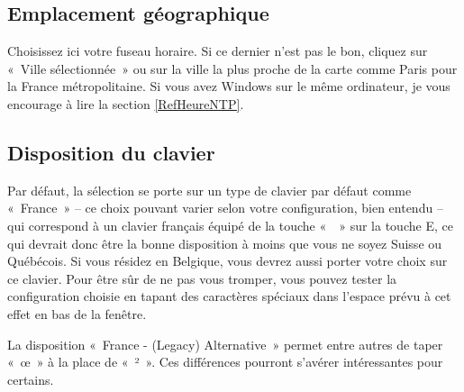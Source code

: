 \subsection{Emplacement géographique}
Choisissez ici votre fuseau horaire. Si ce dernier n'est pas le bon, cliquez sur «~Ville sélectionnée~» ou sur la ville la plus proche de la carte comme Paris pour la France métropolitaine. Si vous avez Windows sur le même ordinateur, je vous encourage à lire la section \ref{RefHeureNTP}.
\subsection{Disposition du clavier}
Par défaut, la sélection se porte sur un type de clavier par défaut comme «~France~» -- ce choix pouvant varier selon votre configuration, bien entendu -- qui correspond à un clavier français équipé de la touche «~\texteuro{}~» sur la touche E, ce qui devrait donc être la bonne disposition à moins que vous ne soyez Suisse ou Québécois. Si vous résidez en Belgique, vous devrez aussi porter votre choix sur ce clavier. Pour être sûr de ne pas vous tromper, vous pouvez tester la configuration choisie en tapant des caractères spéciaux dans l'espace prévu à cet effet en bas de la fenêtre.
\begin{nota}
La disposition «~France - (Legacy) Alternative~» permet entre autres de taper «~œ~» à la place de «~²~». Ces différences pourront s'avérer intéressantes pour certains.
\end{nota}
